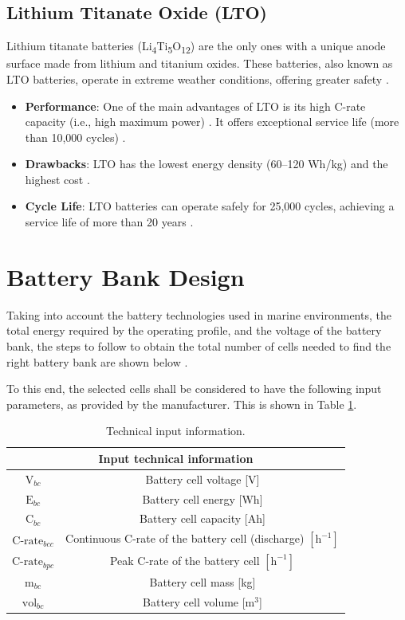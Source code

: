 \subsection{Lithium Titanate Oxide (LTO)}

Lithium titanate batteries (Li\textsubscript{4}Ti\textsubscript{5}O\textsubscript{12}) are the only ones with a unique anode surface made from lithium and titanium oxides. These batteries, also known as LTO batteries, operate in extreme weather conditions, offering greater safety \cite{Sunreef}.

\begin{itemize}
	\item \textbf{Performance}: One of the main advantages of LTO is its high C-rate capacity (i.e., high maximum power) \cite{Echandia}. It offers exceptional service life (more than 10,000 cycles) \cite{evlithium}.
	\item  \textbf{Drawbacks}: LTO has the lowest energy density (60–120 Wh/kg) and the highest cost \cite{evlithium}.
	\item \textbf{Cycle Life}: LTO batteries can operate safely for 25,000 cycles, achieving a service life of more than 20 years \cite{Echandia}.
\end{itemize}

\section{Battery Bank Design}

Taking into account the battery technologies used in marine environments, the total energy required by the operating profile, and the voltage of the battery bank, the steps to follow to obtain the total number of cells needed to find the right battery bank are shown below \cite{x-engineer}.

To this end, the selected cells shall be considered to have the following input parameters, as provided by the manufacturer. This is shown in Table \ref{tab:Technical_input}.

\begin{table}[H]
	\centering
	\caption{Technical input information.}
	\label{tab:Technical_input}
	\begin{tabular}{|c|c|}
		\hline
		\multicolumn{2}{|c|}{\textbf{Input technical information}} \\
		\hline\hline
		$\text{V}_{bc}$ & Battery cell voltage [V]    \\	
		\hline
		$\text{E}_{bc}$ & Battery cell energy  [Wh]   \\	
		\hline
		$\text{C}_{bc}$ & Battery cell capacity [Ah]   \\	
		\hline
		$\text{C-rate}_{bcc}$ &  Continuous C-rate of the battery cell (discharge) $[\text{h}^{-1}]$ \\	
		\hline
		$\text{C-rate}_{bpc}$ &  Peak C-rate of the battery cell $[\text{h}^{-1}]$ \\	
		\hline
		$\text{m}_{bc}$ & Battery cell mass [kg]    \\	
		\hline
		$\text{vol}_{bc}$ & Battery cell volume [${\text{m}}^{3}$]    \\	
		\hline		
	\end{tabular}
\end{table} 

